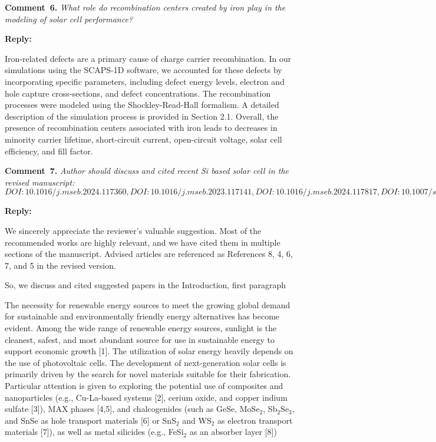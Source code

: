 \documentclass[a4paper,fleqn]{cas-sc}
\begin{document}
\vspace{1cm}
\noindent
\textcolor[rgb]{0.00,0.50,1.00}{\textbf{Comment~6.}}
\emph{What role do recombination centers created by iron play in the modeling of solar cell performance?}


\noindent
\textcolor[rgb]{0.51,0.00,0.00}{\textbf{Reply:}}

Iron-related defects are a primary cause of charge carrier recombination.
In our simulations using the SCAPS-1D software,
we accounted for these defects by incorporating specific parameters,
including defect energy levels, electron and hole capture cross-sections, and defect concentrations.
The recombination processes were modeled using the Shockley-Read-Hall formalism.
A detailed description of the simulation process is provided in Section 2.1.
Overall, the presence of recombination centers associated with iron leads to decreases in minority carrier lifetime,
short-circuit current, open-circuit voltage, solar cell efficiency, and fill factor.



\vspace{1cm}
\noindent
\textcolor[rgb]{0.00,0.50,1.00}{\textbf{Comment~7.}}
\emph{Author should discuss and cited recent Si based solar cell in the revised manuscript:
$DOI:10.1016/j.mseb.2024.117360,
DOI:10.1016/j.mseb.2023.117141,
DOI:10.1016/j.mseb.2024.117817,
DOI:10.1007/s42247-024-00821-y,
DOI:10.1016/j.inoche.2024.112785$}

\noindent
\textcolor[rgb]{0.51,0.00,0.00}{\textbf{Reply:}}


We sincerely appreciate the reviewer’s valuable suggestion.
Most of the recommended works are highly relevant, and we have cited them in multiple sections of the manuscript.
Advised articles are referenced as References 8, 4, 6, 7, and 5 in the revised version.

So, we discuss and cited suggested papers in the Introduction, first paragraph

\begin{mdframed}
The necessity for renewable energy sources to meet the growing global demand for sustainable and environmentally friendly energy alternatives has become evident.
Among the wide range of renewable energy sources, sunlight is the cleanest, safest,
and most abundant source for use in sustainable energy to support economic growth [1].
The utilization of solar energy heavily depends on the use of photovoltaic cells.
\textcolor[rgb]{1.00,0.07,0.00}{
The development of next-generation solar cells is primarily driven by the search for novel materials suitable for their fabrication.
Particular attention is given to exploring the potential use of composites and nanoparticles
(e.g., Cu-La-based systems [2], cerium oxide, and copper indium sulfate [3]),
MAX phases [4,5],
and chalcogenides (such as GeSe, MoSe$_2$, Sb$_2$Se$_3$, and SnSe as hole transport materials [6]
or SnS$_2$ and WS$_2$ as electron transport materials [7]),
as well as metal silicides (e.g., FeSi$_2$ as an absorber layer [8])}
\end{mdframed}
\end{document}
